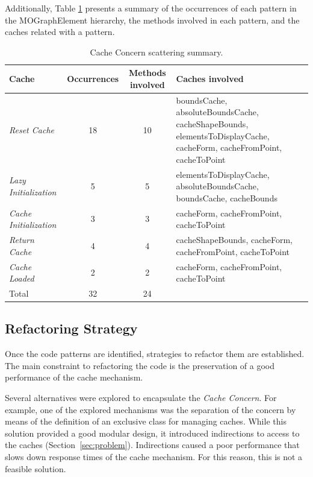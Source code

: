 \documentclass[preprint,10pt]{sigplanconf}
\newcommand{\secref}[1]{Section~\ref{sec:#1}\xspace}
\begin{document}
Additionally, Table \ref{tab:Cache-Concern-scattering} presents a
summary of the occurrences of each pattern in the MOGraphElement hierarchy,
the methods involved in each pattern, and the caches related with
a pattern.

%
\begin{table}
\begin{centering}
\begin{tabular}{|p{2.5cm}|c|c|p{3.5cm}|}
\hline 
Cache  & Occurrences  & Methods involved  & Caches involved\tabularnewline
\hline
\hline 
\emph{Reset Cache}  & 18 & 10 & boundsCache, absoluteBoundsCache, cacheShapeBounds, elementsToDisplayCache,
cacheForm, cacheFromPoint, cacheToPoint\tabularnewline
\hline 
\emph{Lazy Initialization}  & 5 & 5 & elementsToDisplayCache, absoluteBoundsCache, boundsCache, cacheBounds\tabularnewline
\hline 
\emph{Cache Initialization}  & 3 & 3 & cacheForm, cacheFromPoint, cacheToPoint\tabularnewline
\hline 
\emph{Return Cache}  & 4 & 4 & cacheShapeBounds, cacheForm, cacheFromPoint, cacheToPoint\tabularnewline
\hline 
\emph{Cache Loaded} & 2 & 2 & cacheForm, cacheFromPoint, cacheToPoint\tabularnewline
\hline 
Total  & 32 & 24 & \multicolumn{1}{c}{}\tabularnewline
\cline{1-3} 
\end{tabular}
\par\end{centering}

\caption{Cache Concern scattering summary.\label{tab:Cache-Concern-scattering}}

\end{table}



\subsection{Refactoring Strategy}

Once the code patterns are identified, strategies to refactor them
are established. The main constraint to refactoring the code is the
preservation of a good performance of the cache mechanism.

Several alternatives were explored to encapsulate the \emph{Cache
Concern}. For example, one of the explored mechanisms was the separation
of the concern by means of the definition of an exclusive class for
managing caches. While this solution provided a good modular design,
it introduced indirections to access to the caches (\secref{problem}).
Indirections caused a poor performance that slows down response times
of the cache mechanism. For this reason, this is not a feasible solution.
\end{document}
